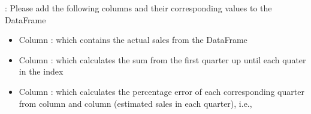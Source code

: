\documentclass[letterpaper,10pt,english]{jupyterBook}
\begin{document}
\sphinxAtStartPar
{}: Please add the following columns and their corresponding values to the  DataFrame
\begin{itemize}
\item {} 
\sphinxAtStartPar
Column : which contains the actual sales from the DataFrame 

\item {} 
\sphinxAtStartPar
Column : which calculates the sum from the first quarter up until each quater in the index

\item {} 
\sphinxAtStartPar
Column : which calculates the percentage error of each corresponding quarter from column  and column  (estimated sales in each quarter), i.e., 

\end{itemize}
\end{document}
